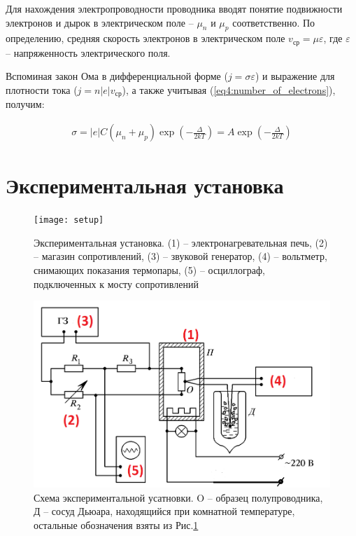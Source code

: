 \documentclass[a4paper,12pt]{article}
\begin{document}
Для нахождения электропроводности проводника вводят понятие подвижности электронов и дырок в электрическом поле -- $\mu_n$ и $\mu_p$ соответственно. По определению, средняя скорость электронов в электрическом поле $v_{ср} = \mu \varepsilon$, где $\varepsilon$ -- напряженность электрического поля.

Вспоминая закон Ома в дифференциальной форме ($j = \sigma \varepsilon$) и выражение для плотности тока ($j = n |e| v_{ср}$), а также учитывая (\ref{eq4:number_of_electrons}), получим:

\begin{align} \label{eq5:dependence_of_temperature}
	\sigma = |e| C (\mu_n + \mu_p) \exp \left( - \frac{\Delta}{2kT} \right) = A \exp \left( - \frac{\Delta}{2kT} \right)
\end{align}

\pagebreak

\section*{Экспериментальная установка}

\begin{figure}[h!]
	\centering
	\texttt{[image: setup]}
	\caption{Экспериментальная установка. (1) -- электронагревательная печь, (2) -- магазин сопротивлений, (3) -- звуковой генератор, (4) -- вольтметр, снимающих показания термопары, (5) -- осциллограф, подключенных к мосту сопротивлений}
	\label{fig3:setup}
\end{figure}

\begin{figure}[h!]
	\centering
	\includegraphics[width=0.8\linewidth]{scheme}
	\caption{Схема экспериментальной усатновки. O -- образец полупроводника, Д -- сосуд Дьюара, находящийся при комнатной температуре, остальные обозначения взяты из Рис.\ref{fig3:setup}}
\end{figure}
\end{document}
